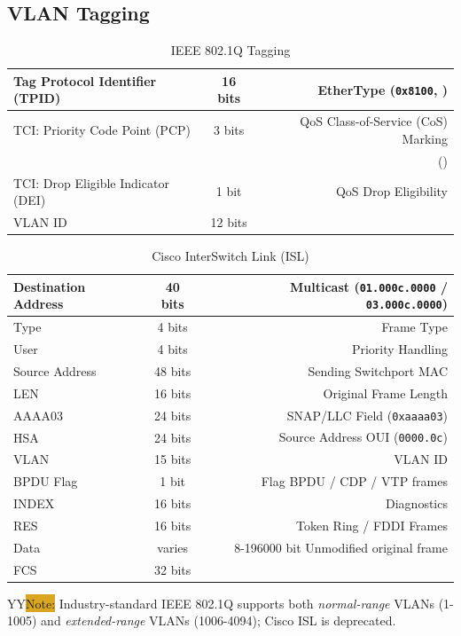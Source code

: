\documentclass[12pt]{article}
\newcommand{\printColor}{Y}								%
\newcommand{\note}[1]{\if\printColor Y{\colorbox{#1}{Note:}}\else{\underline{Note:}}\fi}
\begin{document}
	\subsection{VLAN Tagging \label{subsec:VLAN TAGGING}}
	\begin{table}[H]
	\centering
	\caption{IEEE 802.1Q Tagging \label{tab:802.1Q}}
	\begin{tabular}{| l | c | r |}\hline
	Tag Protocol Identifier (TPID)		& 16 bits	& EtherType (\texttt{0x8100}, \Cref{tab:ETHERTYPE})\\\hline
	TCI: Priority Code Point (PCP)		& 3 bits	& QoS Class-of-Service (CoS) Marking\\
							&		& (\Cref{sec:QOS})\\\hline
	TCI: Drop Eligible Indicator (DEI)	& 1 bit 	& QoS Drop Eligibility\\\hline
	VLAN ID 					& 12 bits	&\\\hline
	\end{tabular}\end{table}

	\begin{table}[H]
	\centering
	\caption{Cisco InterSwitch Link (ISL) \label{tab:CISCO ISL}}
	\begin{tabular}{| l | c | r |}\hline
	Destination Address	& 40 bits	& Multicast (\texttt{01.000c.0000} / \texttt{03.000c.0000})\\\hline
	Type				& 4 bits	& Frame Type\\\hline
	User				& 4 bits	& Priority Handling\\\hline
	Source Address		& 48 bits	& Sending Switchport MAC\\\hline
	LEN				& 16 bits	& Original Frame Length\\\hline
	AAAA03			& 24 bits	& SNAP/LLC Field (\texttt{0xaaaa03})\\\hline
	HSA				& 24 bits	& Source Address OUI (\texttt{0000.0c})\\\hline
	VLAN				& 15 bits	& VLAN ID\\\hline
	BPDU Flag			& 1 bit 	& Flag BPDU / CDP / VTP frames\\\hline
	INDEX			& 16 bits	& Diagnostics\\\hline
	RES				& 16 bits	& Token Ring / FDDI Frames\\\hline
	Data				& varies	& 8-196000 bit Unmodified original frame\\\hline
	FCS				& 32 bits	&\\\hline
	\end{tabular}\end{table}
	\note{Goldenrod} Industry-standard IEEE 802.1Q supports both \textit{normal-range} VLANs (1-1005) and \textit{extended-range} VLANs (1006-4094); Cisco ISL is deprecated.
\end{document}
